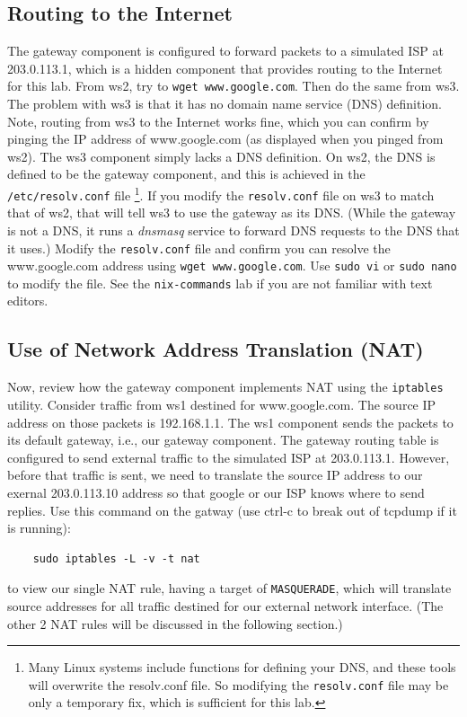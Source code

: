 \subsection{Routing to the Internet}
The gateway component is configured to forward packets to a simulated ISP at 203.0.113.1, which 
is a hidden component that provides routing to the Internet for this lab.  From ws2, 
try to {\tt wget www.google.com}.  Then do the same from ws3.  The problem with ws3 is that
it has no domain name service (DNS) definition.  Note, routing from ws3 to the Internet
works fine, which you can confirm by pinging the IP address of www.google.com (as displayed
when you pinged from ws2).  The ws3 component simply lacks a DNS definition. 
On ws2, the DNS is defined to be the
gateway component, and this is achieved in the \texttt{/etc/resolv.conf} file \footnote{
Many Linux systems include functions for defining your DNS, and these tools will overwrite
the resolv.conf file.  So modifying the {\tt resolv.conf} file may be only a temporary
fix, which is sufficient for this lab.}.  If you 
modify the {\tt resolv.conf} file on ws3 to match that of ws2, that will tell ws3 to use the gateway
as its DNS.  (While the gateway is not a DNS, it runs a \textit{dnsmasq} service to forward DNS requests to
the DNS that it uses.)   Modify the {\tt resolv.conf} file and confirm you can resolve the www.google.com
address using {\tt wget www.google.com}.  Use {\tt sudo vi} or {\tt sudo nano} to modify the file.  See the 
{\tt nix-commands} lab if you are not familiar with text editors.

\subsection{Use of Network Address Translation (NAT)}
Now, review how the gateway component implements NAT using the \texttt{iptables} 
utility.  Consider traffic from ws1 destined for www.google.com. The source IP address
on those packets is 192.168.1.1.  The ws1 component sends the packets to its default
gateway, i.e., our gateway component.  The gateway routing table is configured to
send external traffic to the simulated ISP at 203.0.113.1.  However, before that traffic is sent, we need
to translate the source IP address to our exernal 203.0.113.10 address so that google or our ISP knows
where to send replies.  
Use this command on the gatway (use ctrl-c to break out of tcpdump if it is running):
\begin{verbatim}
    sudo iptables -L -v -t nat
\end{verbatim}
\noindent to view our single NAT rule, having a target of \texttt{MASQUERADE}, which will translate
source addresses for all traffic destined for our external network interface. (The other 2 NAT rules will
be discussed in the following section.) 

